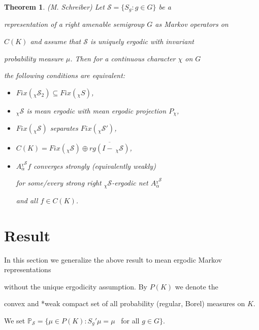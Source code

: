 \documentclass{amsart}
\newtheorem{thm}{Theorem}[section]
\theoremstyle{definition}
\theoremstyle{remark}
\numberwithin{equation}{section}
\begin{document}
\begin{thm} (M. Schreiber) Let $\mathcal{S} = \{ S_g : g\in G \}$ be a

representation of a right amenable semigroup $G$ as Markov operators on

$C(K)$ and assume that $\mathcal{S}$ is uniquely ergodic with invariant

probability measure $\mu $. Then for a continuous character $\chi $ on $G$

the following conditions are equivalent:

\begin{itemize}

\item[(1)] $Fix(_{\chi}\mathcal{S}_2 ) \subseteq Fix(_{\chi}S)$,

\item[(2)] $_{\chi}\mathcal{S}$ is mean ergodic with mean ergodic projection $P_{\chi}$,

\item[(3)] $Fix(\mathcal{_{\chi}S})$ separates $Fix(_{\chi}\mathcal{S}')$,

\item[(3)] $C(K) = Fix(_{\chi}\mathcal{S})\oplus \overline{rg(I - \ _{\chi}\mathcal{S})} $,

\item[(4)] $A_{\alpha}^{_{\chi}\mathcal{S}}f$ converges strongly (equivalently weakly)

for some/every strong right $_{\chi}\mathcal{S}$-ergodic net $A_{\alpha}^{_{\chi}\mathcal{S}}$

and all $f\in C(K)$.

\end{itemize}

\end{thm}



\section{Result}



In this section we generalize the above result to mean ergodic Markov representations

without the unique ergodicity assumption. By $P(K)$ we denote  the

convex and *weak compact set of all probability (regular, Borel) measures on $K$.

We set $\mathbb{P}_{\mathcal{S}} = \{ \mu\in P(K) : S_g'\mu = \mu $ \ for all $g\in G \}$.
\end{document}
